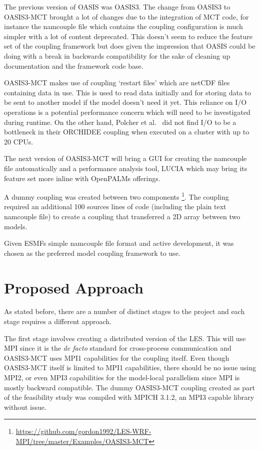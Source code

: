 \documentclass{acm_proc_article-sp}
\renewcommand{\_}{\underscore\hspace{0pt}}
\begin{document}
The previous version of OASIS was OASIS3. The change from OASIS3 to OASIS3-MCT
brought a lot of changes due to the integration of MCT code, for instance the
namcouple file which contains the coupling configuration is much simpler with a
lot of content deprecated. This doesn't seem to reduce the feature set of the
coupling framework but does given the impression that OASIS could be doing with
a break in backwards compatibility for the sake of cleaning up documentation and
the framework code base.

OASIS3-MCT makes use of coupling `restart files' which are netCDF files
containing data in use. This is used to read data initially and for storing data
to be sent to another model if the model doesn't need it yet. This reliance on
I/O operations is a potential performance concern which will need to be
investigated during runtime. On the other hand, Polcher et al.\
\cite{Polcher2013} did not find I/O to be a bottleneck in their ORCHIDEE
coupling when executed on a cluster with up to 20 CPUs.

The next version of OASIS3-MCT will bring a GUI for creating the namcouple file
automatically and a performance analysis tool, LUCIA \cite{Maisonnave} which may
bring its feature set more inline with OpenPALMs offerings.

A dummy coupling was created between two components
\footnote{\url{https://github.com/gordon1992/LES-WRF-MPI/tree/master/Examples/OASIS3-MCT}}.
The coupling required an additional 100 sources lines of code (including the
plain text namcouple file) to create a coupling that transferred a 2D array
between two models.

Given ESMFs simple namcouple file format and active development, it was chosen
as the preferred model coupling framework to use.

\section*{Proposed Approach}

As stated before, there are a number of distinct stages to the project and each
stage requires a different approach.

The first stage involves creating a distributed version of the LES. This will
use MPI since it is the \textit{de facto} standard for cross-process
communication and OASIS3-MCT uses MPI1 capabilities for the coupling itself.
Even though OASIS3-MCT itself is limited to MPI1 capabilities, there should be
no issue using MPI2, or even MPI3 capabilities for the model-local parallelism
since MPI is mostly backward compatible. The dummy OASIS3-MCT coupling created
as part of the feasibility study was compiled with MPICH 3.1.2, an MPI3 capable
library without issue.
\end{document}
